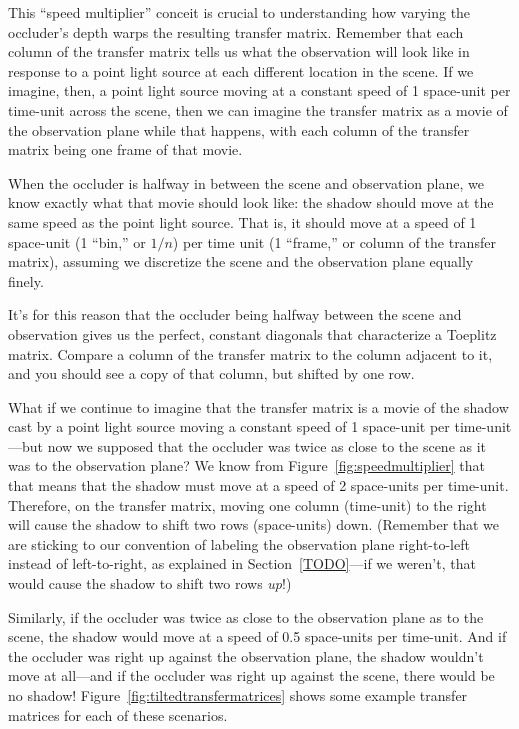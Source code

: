 This ``speed multiplier'' conceit is crucial to understanding how varying the occluder's depth warps the resulting transfer matrix. Remember that each column of the transfer matrix tells us what the observation will look like in response to a point light source at each different location in the scene. If we imagine, then, a point light source moving at a constant speed of 1 space-unit per time-unit across the scene, then we can imagine the transfer matrix as a movie of the observation plane while that happens, with each column of the transfer matrix being one frame of that movie. 

When the occluder is halfway in between the scene and observation plane, we know exactly what that movie should look like: the shadow should move at the same speed as the point light source. That is, it should move at a speed of 1 space-unit (1 ``bin,'' or $1/n$) per time unit (1 ``frame,'' or column of the transfer matrix), assuming we discretize the scene and the observation plane equally finely.

It's for this reason that the occluder being halfway between the scene and observation gives us the perfect, constant diagonals that characterize a Toeplitz matrix. Compare a column of the transfer matrix to the column adjacent to it, and you should see a copy of that column, but shifted by one row.

What if we continue to imagine that the transfer matrix is a movie of the shadow cast by a point light source moving a constant speed of 1 space-unit per time-unit---but now we supposed that the occluder was twice as close to the scene as it was to the observation plane? We know from Figure~\ref{fig:speedmultiplier} that that means that the shadow must move at a speed of 2 space-units per time-unit. Therefore, on the transfer matrix, moving one column (time-unit) to the right will cause the shadow to shift two rows (space-units) down. (Remember that we are sticking to our convention of labeling the observation plane right-to-left instead of left-to-right, as explained in Section~\ref{TODO}---if we weren't, that would cause the shadow to shift two rows \emph{up}!)

Similarly, if the occluder was twice as close to the observation plane as to the scene, the shadow would move at a speed of 0.5 space-units per time-unit. And if the occluder was right up against the observation plane, the shadow wouldn't move at all---and if the occluder was right up against the scene, there would be no shadow! Figure~\ref{fig:tiltedtransfermatrices} shows some example transfer matrices for each of these scenarios.
 
